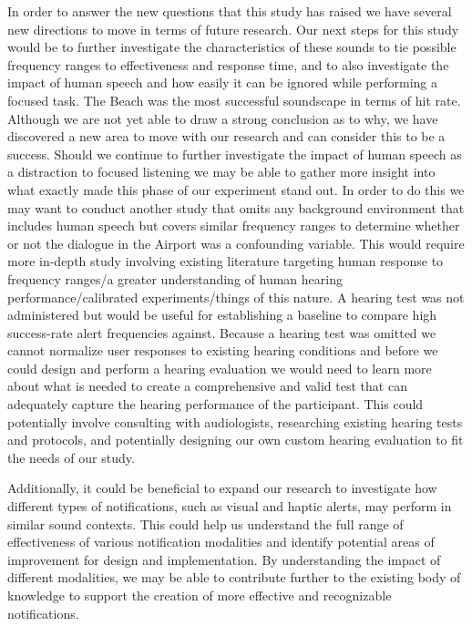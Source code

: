 \documentclass[manuscript,screen,review]{acmart}
\begin{document}
In order to answer the new questions that this study has raised we have several new directions to move in terms of future research. Our next steps for this study would be to further investigate the characteristics of these sounds to tie possible frequency ranges to effectiveness and response time, and to also investigate the impact of human speech and how easily it can be ignored while performing a focused task. The Beach was the most successful soundscape in terms of hit rate. Although we are not yet able to draw a strong conclusion as to why, we have discovered a new area to move with our research and can consider this to be a success. Should we continue to further investigate the impact of human speech as a distraction to focused listening we may be able to gather more insight into what exactly made this phase of our experiment stand out. In order to do this we may want to conduct another study that omits any background environment that includes human speech but covers similar frequency ranges to determine whether or not the dialogue in the Airport was a confounding variable. This would require more in-depth study involving existing literature targeting human response to frequency ranges/a greater understanding of human hearing performance/calibrated experiments/things of this nature. A hearing test was not administered but would be useful for establishing a baseline to compare high success-rate alert frequencies against. Because a hearing test was omitted we cannot normalize user responses to existing hearing conditions and before we could design and perform a hearing evaluation we would need to learn more about what is needed to create a comprehensive and valid test that can adequately capture the hearing performance of the participant. This could potentially involve consulting with audiologists, researching existing hearing tests and protocols, and potentially designing our own custom hearing evaluation to fit the needs of our study.

Additionally, it could be beneficial to expand our research to investigate how different types of notifications, such as visual and haptic alerts, may perform in similar sound contexts. This could help us understand the full range of effectiveness of various notification modalities and identify potential areas of improvement for design and implementation. By understanding the impact of different modalities, we may be able to contribute further to the existing body of knowledge to support the creation of more effective and recognizable notifications.
\end{document}
